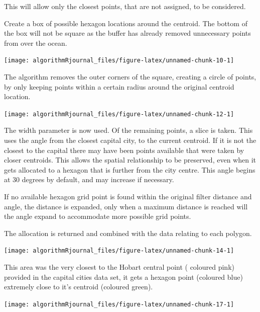 This will allow only the closest points, that are not assigned, to be
considered.

Create a box of possible hexagon locations around the centroid. The
bottom of the box will not be square as the buffer has already removed
unnecessary points from over the ocean.

\begin{Schunk}

\texttt{[image: algorithmRjournal\_files/figure-latex/unnamed-chunk-10-1]} \end{Schunk}

The algorithm removes the outer corners of the square, creating a circle
of points, by only keeping points within a certain radius around the
original centroid location.

\begin{Schunk}

\texttt{[image: algorithmRjournal\_files/figure-latex/unnamed-chunk-12-1]} \end{Schunk}

The width parameter is now used. Of the remaining points, a slice is
taken. This uses the angle from the closest capital city, to the current
centroid. If it is not the closest to the capital there may have been
points available that were taken by closer centroids. This allows the
spatial relationship to be preserved, even when it gets allocated to a
hexagon that is further from the city centre. This angle begins at 30
degrees by default, and may increase if necessary.

If no available hexagon grid point is found within the original filter
distance and angle, the distance is expanded, only when a maximum
distance is reached will the angle expand to accommodate more possible
grid points.

The allocation is returned and combined with the data relating to each
polygon.

\begin{Schunk}

\texttt{[image: algorithmRjournal\_files/figure-latex/unnamed-chunk-14-1]} \end{Schunk}

This area was the very closest to the Hobart central point ( coloured
pink) provided in the capital cities data set, it gets a hexagon point
(coloured blue) extremely close to it's centroid (coloured green).

\begin{Schunk}

\texttt{[image: algorithmRjournal\_files/figure-latex/unnamed-chunk-17-1]} \end{Schunk}

